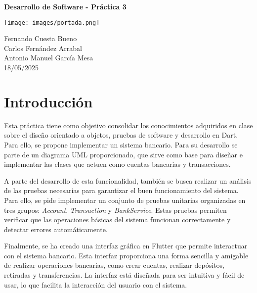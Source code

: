 \documentclass[12pt]{article}
\begin{document}
\begin{titlepage}

    \centering
    \vspace*{1cm}
    \vspace{0.5cm}
    {\Huge\bfseries Desarrollo de Software - Práctica 3\par}
    \vspace{1.5cm}
    \texttt{[image: images/portada.png]}
    \vspace{1.5cm}
    \par %
    \vspace{1cm}
    {\Large Fernando Cuesta Bueno
        \\
        Carlos Fernández Arrabal
        \\
        Antonio Manuel García Mesa
        \\
        18/05/2025\par}

\end{titlepage}

\tableofcontents

\newpage


\section*{Introducción}
\setlength{\parindent}{0pt}
Esta práctica tiene como objetivo consolidar los conocimientos adquiridos en clase sobre el diseño orientado a objetos, pruebas de software y desarrollo en Dart. Para ello, se propone implementar un sistema bancario. Para su desarrollo se parte de un diagrama UML proporcionado, que sirve como base para diseñar e implementar las clases que actuen como cuentas bancarias y transacciones.

\vspace{0.2cm}
A parte del desarrollo de esta funcionalidad, también se busca realizar un análisis de las pruebas necesarias para garantizar el buen funcionamiento del sistema. Para ello, se pide implementar un conjunto de pruebas unitarias organizadas en tres grupos: \textit{Account}, \textit{Transaction} y \textit{BankService}. Estas pruebas permiten verificar que las operaciones básicas del sistema funcionan correctamente y detectar errores automáticamente.
\vspace{0.2cm}

Finalmente, se ha creado una interfaz gráfica en Flutter que permite interactuar con el sistema bancario. Esta interfaz proporciona una forma sencilla y amigable de realizar operaciones bancarias, como crear cuentas, realizar depósitos, retiradas y transferencias. La interfaz está diseñada para ser intuitiva y fácil de usar, lo que facilita la interacción del usuario con el sistema.
\end{document}
